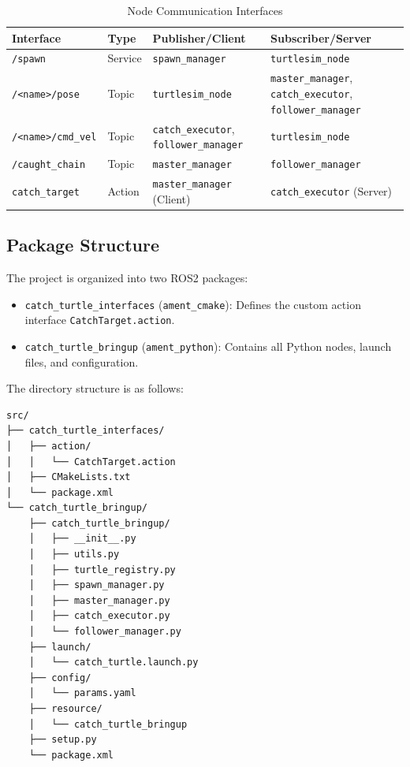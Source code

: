 \documentclass[12pt,a4paper]{article}
\begin{document}
\begin{table}[H]
\centering
\caption{Node Communication Interfaces}
\label{tab:communication}
\begin{tabular}{llll}
\toprule
\textbf{Interface} & \textbf{Type} & \textbf{Publisher/Client} & \textbf{Subscriber/Server} \\
\midrule
\texttt{/spawn} & Service & \texttt{spawn\_manager} & \texttt{turtlesim\_node} \\
\texttt{/<name>/pose} & Topic & \texttt{turtlesim\_node} & \texttt{master\_manager}, \texttt{catch\_executor}, \texttt{follower\_manager} \\
\texttt{/<name>/cmd\_vel} & Topic & \texttt{catch\_executor}, \texttt{follower\_manager} & \texttt{turtlesim\_node} \\
\texttt{/caught\_chain} & Topic & \texttt{master\_manager} & \texttt{follower\_manager} \\
\texttt{catch\_target} & Action & \texttt{master\_manager} (Client) & \texttt{catch\_executor} (Server) \\
\bottomrule
\end{tabular}
\end{table}

\subsection{Package Structure}

The project is organized into two ROS2 packages:

\begin{itemize}
  \item \texttt{catch\_turtle\_interfaces} (\texttt{ament\_cmake}): Defines the custom action interface \texttt{CatchTarget.action}.
  \item \texttt{catch\_turtle\_bringup} (\texttt{ament\_python}): Contains all Python nodes, launch files, and configuration.
\end{itemize}

The directory structure is as follows:

\begin{lstlisting}[language={},title={Project Directory Structure}]
src/
├── catch_turtle_interfaces/
│   ├── action/
│   │   └── CatchTarget.action
│   ├── CMakeLists.txt
│   └── package.xml
└── catch_turtle_bringup/
    ├── catch_turtle_bringup/
    │   ├── __init__.py
    │   ├── utils.py
    │   ├── turtle_registry.py
    │   ├── spawn_manager.py
    │   ├── master_manager.py
    │   ├── catch_executor.py
    │   └── follower_manager.py
    ├── launch/
    │   └── catch_turtle.launch.py
    ├── config/
    │   └── params.yaml
    ├── resource/
    │   └── catch_turtle_bringup
    ├── setup.py
    └── package.xml
\end{lstlisting}
\end{document}

